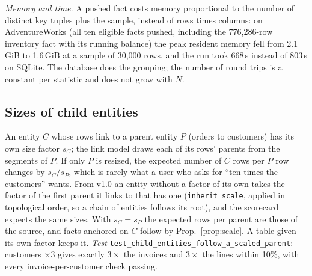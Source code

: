 \noindent\emph{Memory and time.} A pushed fact costs memory proportional to the number of distinct key tuples plus the sample, instead of rows times columns: on AdventureWorks (all ten eligible facts pushed, including the 776{,}286-row inventory fact with its running balance) the peak resident memory fell from 2.1\,GiB to 1.6\,GiB at a sample of 30{,}000 rows, and the run took 668\,s instead of 803\,s on SQLite. The database does the grouping; the number of round trips is a constant per statistic and does not grow with $N$.

\subsection{Sizes of child entities}
An entity $C$ whose rows link to a parent entity $P$ (orders to customers) has its own size factor $s_C$; the link model draws each of its rows' parents from the segments of $P$. If only $P$ is resized, the expected number of $C$ rows per $P$ row changes by $s_C/s_P$, which is rarely what a user who asks for ``ten times the customers'' wants. From v1.0 an entity without a factor of its own takes the factor of the first parent it links to that has one (\texttt{inherit\_scale}, applied in topological order, so a chain of entities follows its root), and the scorecard expects the same sizes. With $s_C=s_P$ the expected rows per parent are those of the source, and facts anchored on $C$ follow by Prop.~\ref{prop:scale}. A table given its own factor keeps it. \emph{Test} \texttt{test\_child\_entities\_follow\_a\_scaled\_parent}: customers $\times3$ gives exactly $3\times$ the invoices and $3\times$ the lines within 10\%, with every invoice-per-customer check passing.

